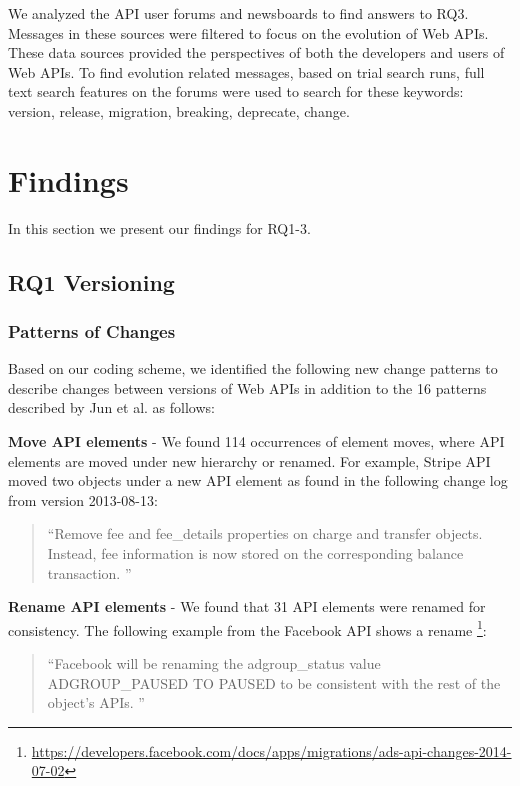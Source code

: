 \documentclass[conference]{IEEEtran}
\begin{document}
We analyzed the API user forums and newsboards to find answers to RQ3. Messages in these sources were filtered to focus on the evolution of Web APIs. These data sources provided the perspectives of both the developers and users of Web APIs. To find evolution related messages, based on trial search runs, full text search features on the forums were used to search for these keywords: version, release, migration, breaking, deprecate, change.


\section{Findings} %
\label{sec:findings}

In this section we present our findings for RQ1-3.

\subsection{RQ1 Versioning} %
\label{sub:versioning}


\subsubsection{Patterns of Changes}

Based on our coding scheme, we identified the following new change patterns to describe changes between versions of Web APIs in addition to the 16 patterns described by Jun et al. \cite{li_client_2013} as follows:

\textbf{Move API elements} - We found 114 occurrences of element moves, where API elements are moved under new hierarchy or renamed. For example, Stripe API moved two objects under a new API element as found in the following change log from version 2013-08-13:

\small
\begin{quotation}
``Remove fee and fee\_details properties on charge and transfer objects. Instead, fee information is now stored on the corresponding balance transaction.
''\end{quotation}
\normalsize

\textbf{Rename API elements} - We found that 31 API elements were renamed for consistency. The following example from the Facebook API shows a rename \footnote{\url{https://developers.facebook.com/docs/apps/migrations/ads-api-changes-2014-07-02}}:

\small
\begin{quotation}
``Facebook will be renaming the adgroup\_status value ADGROUP\_PAUSED TO PAUSED to be consistent with the rest of the object's APIs.
''\end{quotation}
\normalsize
\end{document}
